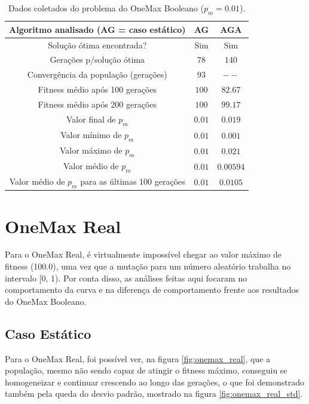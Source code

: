 \begin{table}
\caption{Dados coletados do problema do OneMax Booleano ($p_m = 0.01$).}
\label{tab:onemax_boolean}

\center
\begin{tabular}{|c|cc|}
	\hline
	Algoritmo analisado (AG = caso estático) 			& AG		& AGA		\\
	\hline
	Solução ótima encontrada?							& Sim		& Sim		\\
	Gerações p/solução ótima							& $78$		& $140$		\\
	Convergência da população (gerações)				& $93$		& $--$		\\
	Fitness médio após 100 gerações						& $100$		& $82.67$	\\
	Fitness médio após 200 gerações 					& $100$		& $99.17$	\\
	Valor final de $p_m$								& $0.01$ 	& $0.019$	\\
	Valor mínimo de $p_m$								& $0.01$	& $0.001$	\\
	Valor máximo de $p_m$								& $0.01$	& $0.021$	\\
	Valor médio de $p_m$								& $0.01$	& $0.00594$	\\
	Valor médio de $p_m$ para as últimas 100 gerações	& $0.01$	& $0.0105$	\\
	\hline
\end{tabular}
\end{table}

\section{OneMax Real}

Para o OneMax Real, é virtualmente impossível chegar ao valor máximo de fitness (100.0), uma vez que a mutação para um número aleatório trabalha no intervalo [0, 1). Por conta disso, as análises feitas aqui focaram no comportamento da curva e na diferença de comportamento frente aos resultados do OneMax Booleano.

\subsection{Caso Estático}

Para o OneMax Real, foi possível ver, na figura \ref{fig:onemax_real}, que a população, mesmo não sendo capaz de atingir o fitness máximo, conseguiu se homogeneizar e continuar crescendo ao longo das gerações, o que foi demonstrado também pela queda do desvio padrão, mostrado na figura \ref{fig:onemax_real_std}.

